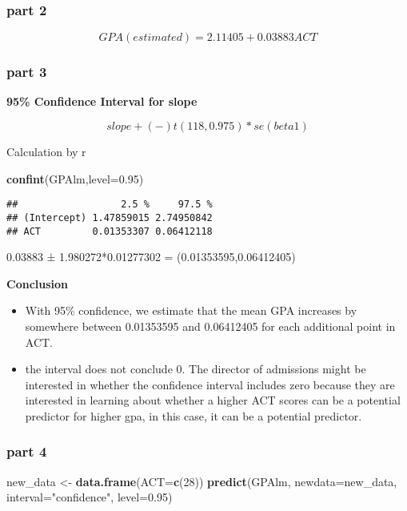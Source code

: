 \documentclass[]{article}
\newenvironment{Shaded}{\begin{snugshade}}{\end{snugshade}}
\newcommand{\DataTypeTok}[1]{\textcolor[rgb]{0.13,0.29,0.53}{#1}}
\newcommand{\DecValTok}[1]{\textcolor[rgb]{0.00,0.00,0.81}{#1}}
\newcommand{\FloatTok}[1]{\textcolor[rgb]{0.00,0.00,0.81}{#1}}
\newcommand{\KeywordTok}[1]{\textcolor[rgb]{0.13,0.29,0.53}{\textbf{#1}}}
\newcommand{\NormalTok}[1]{#1}
\newcommand{\StringTok}[1]{\textcolor[rgb]{0.31,0.60,0.02}{#1}}
\begin{document}
\hypertarget{part-2}{%
\subsubsection{part 2}\label{part-2}}

\[ GPA(estimated) = 2.11405 + 0.03883ACT \]

\hypertarget{part-3}{%
\subsubsection{part 3}\label{part-3}}

\textbf{95\% Confidence Interval for slope}

\[slope +(-) t(118,0.975)*se(beta1)\]

Calculation by r

\begin{Shaded}
\begin{Highlighting}[]
\KeywordTok{confint}\NormalTok{(GPAlm,}\DataTypeTok{level=}\FloatTok{0.95}\NormalTok{)}
\end{Highlighting}
\end{Shaded}

\begin{verbatim}
##                  2.5 %     97.5 %
## (Intercept) 1.47859015 2.74950842
## ACT         0.01353307 0.06412118
\end{verbatim}

0.03883 ± 1.980272*0.01277302 = (0.01353595,0.06412405)

\textbf{Conclusion}

\begin{itemize}
\item
  With 95\% confidence, we estimate that the mean GPA increases by
  somewhere between 0.01353595 and 0.06412405 for each additional point
  in ACT.
\item
  the interval does not conclude 0. The director of admissions might be
  interested in whether the confidence interval includes zero because
  they are interested in learning about whether a higher ACT scores can
  be a potential predictor for higher gpa, in this case, it can be a
  potential predictor.
\end{itemize}

\hypertarget{part-4}{%
\subsubsection{part 4}\label{part-4}}

\begin{Shaded}
\begin{Highlighting}[]
\NormalTok{new_data <-}\StringTok{ }\KeywordTok{data.frame}\NormalTok{(}\DataTypeTok{ACT=}\KeywordTok{c}\NormalTok{(}\DecValTok{28}\NormalTok{))}
\KeywordTok{predict}\NormalTok{(GPAlm, }\DataTypeTok{newdata=}\NormalTok{new_data, }\DataTypeTok{interval=}\StringTok{"confidence"}\NormalTok{, }\DataTypeTok{level=}\FloatTok{0.95}\NormalTok{)}
\end{Highlighting}
\end{Shaded}
\end{document}
